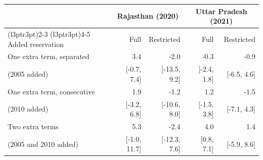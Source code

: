 
\begin{tabular}{lrrrr}
\toprule
\multicolumn{1}{c}{ } & \multicolumn{2}{c}{Rajasthan (2020)} & \multicolumn{2}{c}{Uttar Pradesh (2021)} \\
\cmidrule(l{3pt}r{3pt}){2-3} \cmidrule(l{3pt}r{3pt}){4-5}
Added reservation & Full & Restricted & Full & Restricted\\
\midrule
One extra term, separated & 3.4 & -2.0 & -0.3 & -0.9\\
(2005 added) & {}[-0.7, 7.4] & {}[-13.5, 9.2] & {}[-2.4, 1.8] & {}[-6.5, 4.6]\\
\addlinespace[0.5em]
One extra term, consecutive & 1.9 & -1.2 & 1.2 & -1.5\\
(2010 added) & {}[-3.2, 6.8] & {}[-10.6, 8.0] & {}[-1.5, 3.8] & {}[-7.1, 4.3]\\
\addlinespace[0.5em]
Two extra terms & 5.3 & -2.4 & 4.0 & 1.4\\
(2005 and 2010 added) & {}[-1.0, 11.7] & {}[-12.3, 7.6] & {}[0.8, 7.1] & {}[-5.9, 8.6]\\
\bottomrule
\end{tabular}
